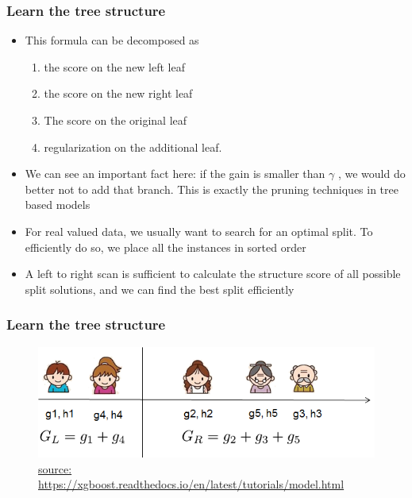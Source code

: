 \documentclass[
  shownotes,
  xcolor={svgnames},
  hyperref={colorlinks,citecolor=DarkBlue,linkcolor=DarkRed,urlcolor=DarkBlue}
  , aspectratio=169]{beamer}
\begin{document}
\begin{frame}[fragile]
\frametitle{Learn the tree structure}

\begin{itemize}
  \item This formula can be decomposed as 
\begin{enumerate}
\item  the score on the new left leaf 
\item the score on the new right leaf 
\item The score on the original leaf 
\item  regularization on the additional leaf. 
\end{enumerate}
\item We can see an important fact here: if the gain is smaller than $\gamma$ , we would do better not to add that branch. This is exactly the pruning techniques in tree based models

\item For real valued data, we usually want to search for an optimal split. To efficiently do so, we place all the instances in sorted order

\item A left to right scan is sufficient to calculate the structure score of all possible split solutions, and we can find the best split efficiently
\end{itemize}

\end{frame}
\begin{frame}[fragile]
\frametitle{Learn the tree structure}

  \begin{figure}[H] \centering
            \captionsetup{justification=centering}
              \includegraphics[scale=0.6]{figures/tree_structure}
              \\
              \tiny
              \url{source: https://xgboost.readthedocs.io/en/latest/tutorials/model.html}
 \end{figure}
 
\end{frame}
\end{document}
